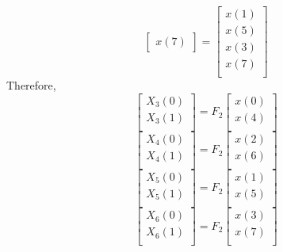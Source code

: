 \documentclass[journal,12pt,twocolumn]{IEEEtran}
\renewcommand\thesection{\arabic{section}}
\begin{document}
\begin{enumerate}[label=\arabic*.,ref=\thesection.\theenumi]
\begin{equation}
\begin{bmatrix}
			x(7)
		\end{bmatrix}
		= 
		\begin{bmatrix}
			x(1) \\ 
			x(5) \\ 
			x(3) \\ 
			x(7) \\
		\end{bmatrix}
	\end{equation}
	Therefore,
	\begin{equation}
		\begin{bmatrix}
			X_{3}(0) \\ 
			X_{3}(1)\\ 
		\end{bmatrix}
		= F_{2}
		\begin{bmatrix}
			x(0) \\ 
			x(4) \\ 
		\end{bmatrix}
	\end{equation}
	\begin{equation}
		\begin{bmatrix}
			X_{4}(0) \\ 
			X_{4}(1)\\ 
		\end{bmatrix}
		= F_{2}
		\begin{bmatrix}
			x(2) \\ 
			x(6) \\ 
		\end{bmatrix}
	\end{equation}
	\begin{equation}
		\begin{bmatrix}
			X_{5}(0) \\ 
			X_{5}(1)\\ 
		\end{bmatrix}
		= F_{2}
		\begin{bmatrix}
			x(1) \\ 
			x(5) \\ 
		\end{bmatrix}
	\end{equation}
	\begin{equation}
		\begin{bmatrix}
			X_{6}(0) \\ 
			X_{6}(1)\\ 
		\end{bmatrix}
		= F_{2}
		\begin{bmatrix}
			x(3) \\ 
			x(7) \\ 

\end{bmatrix}
\end{equation}
\end{enumerate}
\end{document}
